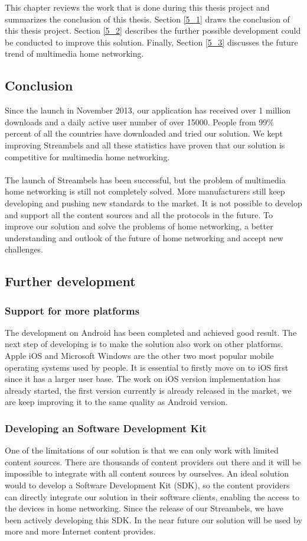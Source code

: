 This chapter reviews the work that is done during this thesis project and
summarizes the conclusion of this thesis. Section \ref{5_1} draws the
conclusion of this thesis project. Section \ref{5_2} describes the further
possible development could be conducted to improve this solution. Finally,
Section \ref{5_3} discusses the future trend of multimedia home networking.
\subsection{Conclusion\label{5_1}}
Since the launch in November 2013, our application has received over 1 million
downloads and a daily active user number of over 15000. People from 99\% percent
of all the countries have downloaded and tried our solution. We kept improving
Streambels and all these statistics have proven that our solution is competitive for multimedia home networking.\\
\\
The launch of Streambels has been successful, but the problem of multimedia
 home networking is still not completely solved. More manufacturers still keep developing and pushing new standards to the market. It is not possible to develop and support all the content sources and all the protocols in the future. To improve our solution and solve the problems of home networking, a better understanding and outlook of the future of home networking and accept new challenges.

\subsection{Further development\label{5_2}}
\subsubsection{Support for more platforms}
The development on Android has been completed and achieved good result. The next step of developing is to make the solution also work on other platforms. Apple iOS and Microsoft Windows are the other two most popular mobile operating systems used by people. It is essential to firstly move on to iOS first since it has a larger user base. The work on iOS version implementation has already started, the first version currently is already released in the market, we are keep improving it to the same quality as Android version.
\subsubsection{Developing an Software Development Kit}
One of the limitations of our solution is that we can only work with limited content sources. There are thousands of content providers out there and it will be impossible to integrate with all content sources by ourselves. An ideal solution would to develop a Software Development Kit (SDK), so the content providers can directly integrate our solution in their software clients, enabling the access to the devices in home networking. Since the release of our Streambels, we have been actively developing this SDK. In the near future our solution will be used by more and more Internet content provides.
